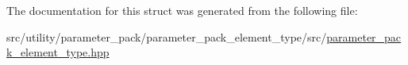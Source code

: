 The documentation for this struct was generated from the following file\-:\begin{DoxyCompactItemize}
\item 
src/utility/parameter\-\_\-pack/parameter\-\_\-pack\-\_\-element\-\_\-type/src/\hyperlink{parameter__pack__element__type_8hpp}{parameter\-\_\-pack\-\_\-element\-\_\-type.\-hpp}\end{DoxyCompactItemize}
